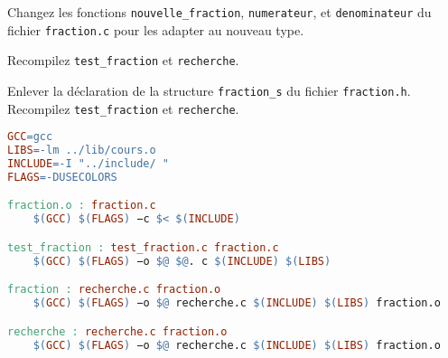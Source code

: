 \question Changez les fonctions \texttt{nouvelle\_fraction},
\texttt{numerateur}, et \texttt{denominateur} du fichier
\texttt{fraction.c} pour les adapter au nouveau type.

\question Recompilez \texttt{test\_fraction} et \texttt{recherche}.

\question Enlever la déclaration de la structure \texttt{fraction\_s}
du fichier \texttt{fraction.h}. Recompilez \texttt{test\_fraction} et
\texttt{recherche}.

\begin{solution}
  \begin{lstlisting}[language=make]
GCC=gcc
LIBS=-lm ../lib/cours.o
INCLUDE=-I "../include/ "
FLAGS=-DUSECOLORS

fraction.o : fraction.c
    $(GCC) $(FLAGS) −c $< $(INCLUDE)

test_fraction : test_fraction.c fraction.c
    $(GCC) $(FLAGS) −o $@ $@. c $(INCLUDE) $(LIBS)

fraction : recherche.c fraction.o
    $(GCC) $(FLAGS) −o $@ recherche.c $(INCLUDE) $(LIBS) fraction.o

recherche : recherche.c fraction.o
    $(GCC) $(FLAGS) −o $@ recherche.c $(INCLUDE) $(LIBS) fraction.o
    
  \end{lstlisting}
\end{solution}

